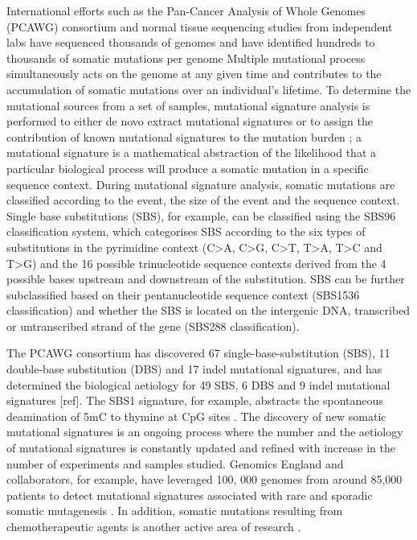 International efforts such as the Pan-Cancer Analysis of Whole Genomes (PCAWG) consortium \cite{ICGCTCGA_Pan-Cancer_Analysis_of_Whole_Genomes_Consortium2020-ts} and normal tissue sequencing studies from independent labs have sequenced thousands of genomes and have identified hundreds to thousands of somatic mutations per genome  Multiple mutational process simultaneously acts on the genome at any given time and contributes to the accumulation of somatic mutations over an individual’s lifetime. To determine the mutational sources from a set of samples, mutational signature analysis is performed to either de novo extract mutational signatures or to assign the contribution of known mutational signatures to the mutation burden \cite{Alexandrov2013-fq}; a mutational signature is a mathematical abstraction of the likelihood that a particular biological process will produce a somatic mutation in a specific sequence context. During mutational signature analysis, somatic mutations are classified according to the event, the size of the event and the sequence context. Single base substitutions (SBS), for example, can be classified using the SBS96 classification system, which categorises SBS according to the six types of substitutions in the pyrimidine context (C>A, C>G, C>T, T>A, T>C and T>G) and the 16 possible trinucleotide sequence contexts derived from the 4 possible bases upstream and downstream of the substitution. SBS can be further subclassified based on their pentanucleotide sequence context (SBS1536 classification) and whether the SBS is located on the intergenic DNA, transcribed or untranscribed strand of the gene (SBS288 classification). 

The PCAWG consortium has discovered 67 single-base-substitution (SBS), 11 double-base substitution (DBS) and 17 indel mutational signatures, and has determined the biological aetiology for 49 SBS, 6 DBS and 9 indel mutational signatures [ref]. The SBS1 signature, for example, abstracts the spontaneous deamination of 5mC to thymine at CpG sites \cite{Alexandrov2020-ys}. The discovery of new somatic mutational signatures is an ongoing process where the number and the aetiology of mutational signatures is constantly updated and refined with increase in the number of experiments and samples studied. Genomics England and collaborators, for example, have leveraged 100, 000 genomes from around 85,000 patients to detect mutational signatures associated with rare and sporadic somatic mutagenesis \cite{Degasperi2022-qe}. In addition, somatic mutations resulting from chemotherapeutic agents is another active area of research \cite{Pich2019-ja, Aitken2020-sa}. 

